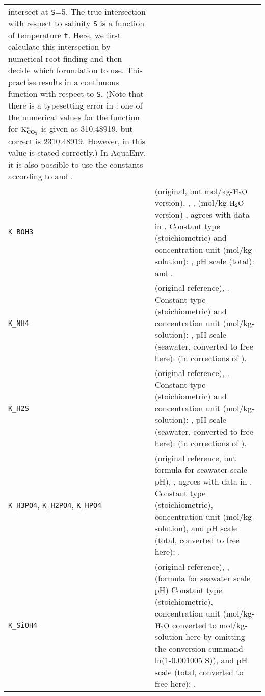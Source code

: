 \documentclass[article,nojss]{jss}
\begin{document}
\begin{footnotesize}
\begin{longtable}{p{}|p{}}
intersect at \texttt{S}=5. The true intersection with respect to salinity \texttt{S} is a function of temperature \texttt{t}. Here, we first calculate this intersection by
numerical root finding and then decide which formulation to use. This practise results in a continuous function with respect to \texttt{S}. (Note that there is a typesetting error in \citet{Roy1993b}: one of the numerical values for the function for $\rm K^*_{CO_2}$ is given as 310.48919, but correct is 2310.48919. However, in \citet{Millero1995} this value is stated correctly.) In \textsf{AquaEnv}, it is also possible to use the constants according to \cite{Lueker2000} and \cite{Millero2006}.\\
\texttt{K\_BOH3}     & \citet[p. 763]{Dickson1990} (original, but mol/kg-$\rm H_2O$ version), \citet[ch. 5, p. 14]{DOE1994}, \citet[p. 262]{Zeebe2001}, \citet[p.669]{Millero1995} (mol/kg-$\rm H_2O$ version) , agrees with data in \citet{Roy1993a}.
Constant type (stoichiometric) and  concentration unit (mol/kg-solution): \citet[chapter 5, p. 14]{DOE1994}, pH scale (total): \citet[chapter 5, p. 12]{DOE1994} and \citet[p.263]{Zeebe2001}. \\
\texttt{K\_NH4}      & \citet{Millero1995a} (original reference), \citet[p.671]{Millero1995}. Constant type (stoichiometric) and concentration unit (mol/kg-solution): \citet[p.671]{Millero1995}, pH scale (seawater, converted to free here):  
\citet{Lewis1998} (in corrections of \citet{Millero1995}).\\
\texttt{K\_H2S}      & \citet{Millero1988} (original reference), \citet[p.671]{Millero1995}. Constant type (stoichiometric) and concentration unit (mol/kg-solution): \citet[p.671]{Millero1995}, pH scale (seawater, converted to free here):  
\citet{Lewis1998} (in corrections of \citet{Millero1995}).\\
\texttt{K\_H3PO4}, \texttt{K\_H2PO4}, \texttt{K\_HPO4} & \citet[p.670]{Millero1995} (original reference, but formula for seawater scale pH), \citet[ch. 5, p 16,17]{DOE1994}, agrees with data in \citet{Dickson1979a}.
 Constant type (stoichiometric), concentration unit (mol/kg-solution), and pH scale (total, converted to free here): \citet[chapter 5, p. 12, 16, 17]{DOE1994}.\\
\texttt{K\_SiOH4}    & \citet{Millero1988} (original reference), \citet[chapter 5, p 17]{DOE1994}, \citet[p.671]{Millero1995} (formula for seawater scale pH)
 Constant type (stoichiometric), concentration unit (mol/kg-$\rm H_2O$ converted to mol/kg-solution here by omitting the conversion summand ln(1-0.001005 S)), and pH scale (total, converted to free here): \citet[chapter 5, p. 12, 17]{DOE1994}.\\

\end{longtable}
\end{footnotesize}
\end{document}
